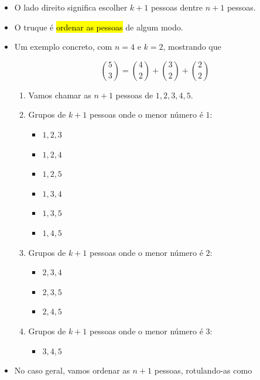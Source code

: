 \documentclass[
  11pt]{report}
\providecommand{\tightlist}{%
  \setlength{\itemsep}{0pt}\setlength{\parskip}{0pt}}
\begin{document}
\begin{itemize}
\item
  O lado direito significa escolher $k + 1$ pessoas dentre $n + 1$ pessoas.
\item
  O truque é {\hl{ordenar as pessoas}} de algum modo.
\item
  Um exemplo concreto, com $n = 4$ e $k = 2$, mostrando que

  \[
  \binom{5}{3} = \binom{4}{2} + \binom{3}{2} + \binom{2}{2}
  \]

  \begin{enumerate}
  \def\labelenumi{\arabic{enumi}.}
  \item
    Vamos chamar as $n + 1$ pessoas de $1, 2, 3, 4, 5$.
  \item
    Grupos de $k + 1$ pessoas onde o menor número é $1$:

    \begin{itemize}
    \tightlist
    \item
      $1, 2, 3$
    \item
      $1, 2, 4$
    \item
      $1, 2, 5$
    \item
      $1, 3, 4$
    \item
      $1, 3, 5$
    \item
      $1, 4, 5$
    \end{itemize}
  \item
    Grupos de $k + 1$ pessoas onde o menor número é $2$:

    \begin{itemize}
    \tightlist
    \item
      $2, 3, 4$
    \item
      $2, 3, 5$
    \item
      $2, 4, 5$
    \end{itemize}
  \item
    Grupos de $k + 1$ pessoas onde o menor número é $3$:

    \begin{itemize}
    \tightlist
    \item
      $3, 4, 5$
    \end{itemize}
  \end{enumerate}
\item
  No caso geral, vamos ordenar as $n + 1$ pessoas, rotulando-as como


\end{itemize}
\end{document}
